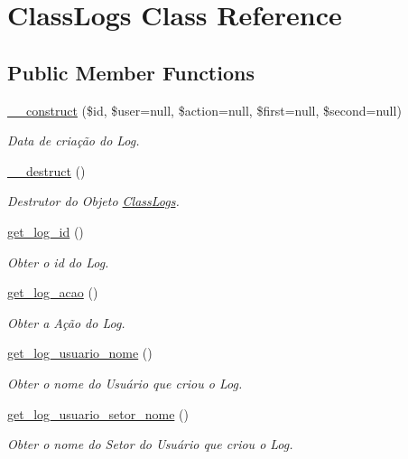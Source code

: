 \hypertarget{class_class_logs}{}\section{Class\+Logs Class Reference}
\label{class_class_logs}
\subsection*{Public Member Functions}
\begin{DoxyCompactItemize}
\item 
\hyperlink{class_class_logs_a0c7ba5a301d60f9335443b0e71bcdbb8}{\+\_\+\+\_\+construct} (\$id, \$user=null, \$action=null, \$first=null, \$second=null)
\begin{DoxyCompactList}\small\item\em Data de criação do Log. \end{DoxyCompactList}\item 
\hyperlink{class_class_logs_a421831a265621325e1fdd19aace0c758}{\+\_\+\+\_\+destruct} ()
\begin{DoxyCompactList}\small\item\em Destrutor do Objeto \hyperlink{class_class_logs}{Class\+Logs}. \end{DoxyCompactList}\item 
\hyperlink{class_class_logs_a46fd12a969be663423a41d6320ab1d4a}{get\+\_\+log\+\_\+id} ()
\begin{DoxyCompactList}\small\item\em Obter o id do Log. \end{DoxyCompactList}\item 
\hyperlink{class_class_logs_ab8ea2a06dc1b1809230c9bb0a5ae929b}{get\+\_\+log\+\_\+acao} ()
\begin{DoxyCompactList}\small\item\em Obter a Ação do Log. \end{DoxyCompactList}\item 
\hyperlink{class_class_logs_ac8005c9321ce5ae129c81180a26a3403}{get\+\_\+log\+\_\+usuario\+\_\+nome} ()
\begin{DoxyCompactList}\small\item\em Obter o nome do Usuário que criou o Log. \end{DoxyCompactList}\item 
\hyperlink{class_class_logs_ac914a1afc0bfd651798dace25249610c}{get\+\_\+log\+\_\+usuario\+\_\+setor\+\_\+nome} ()
\begin{DoxyCompactList}\small\item\em Obter o nome do Setor do Usuário que criou o Log. \end{DoxyCompactList}\item 

\end{DoxyCompactItemize}
